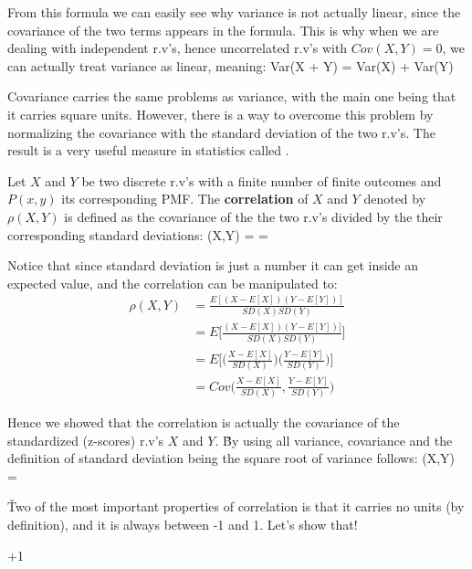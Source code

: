 From this formula we can easily see why variance is not actually linear, since the covariance of the two terms
appears in the formula. This is why when we are dealing with independent r.v's, hence uncorrelated r.v's with $Cov(X,
Y)=0$, we can actually treat variance as linear, meaning:
\bse
Var(X + Y) = Var(X) + Var(Y)
\ese

Covariance carries the same problems as variance, with the main one being that it carries square units. However,
there is a way to overcome this problem by normalizing the covariance with the standard deviation of the two r.v's.
The result is a very useful measure in statistics called .

\bd[Correlation]
Let $X$ and $Y$ be two discrete r.v's with a finite number of finite outcomes and $P(x,y)$ its corresponding PMF. The
\textbf{correlation} of $X$ and $Y$ denoted by $\rho(X,Y)$ is defined as the covariance of the the two r.v's divided
by the their corresponding standard deviations:
\bse
\rho(X,Y) =  = 
\ese
\ed

Notice that since standard deviation is just a number it can get inside an expected value, and the correlation can be
manipulated to:
\begingroup
\allowdisplaybreaks
{\setlength{\jot}{10pt}
\begin{align*}
\rho(X,Y) &= \frac{ E[(X - E[X])(Y - E[Y])]}{SD(X) SD(Y)} \\
&= E \Big[ \frac{(X - E[X])(Y - E[Y])]}{SD(X) SD(Y)} \Big] \\
&= E \Big[ \Big( \frac{X - E[X]}{SD(X)} \Big) \Big( \frac{Y - E[Y]}{SD(Y)} \Big) \Big] \\
&= Cov \Big( \frac{X - E[X]}{SD(X)}, \frac{Y - E[Y]}{SD(Y)} \Big)
\end{align*}}
\endgroup

Hence we showed that the correlation is actually the covariance of the standardized (z-scores) r.v's $X$ and $Y$. \v

By using all variance, covariance and the definition of standard deviation being the square root of variance follows:
\bse
\rho(X,Y) = 
\ese

\v

Two of the most important properties of correlation is that it carries no units (by definition), and it is always
between -1 and 1. Let's show that!

\bt[]
 \leq \rho \leq +1
\ese
\et

